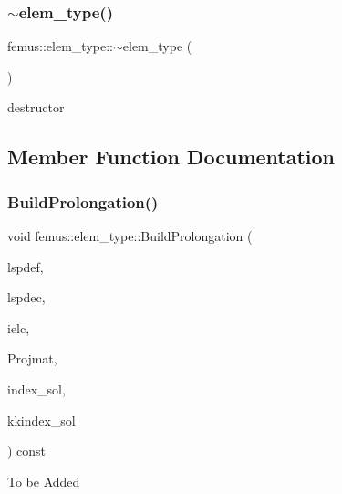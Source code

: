 \subsubsection{\texorpdfstring{$\sim$elem\+\_\+type()}{~elem\_type()}}
{\footnotesize\ttfamily femus\+::elem\+\_\+type\+::$\sim$elem\+\_\+type (\begin{DoxyParamCaption}{ }\end{DoxyParamCaption})\hspace{0.3cm}{\ttfamily [virtual]}}

destructor 

\subsection{Member Function Documentation}
\mbox{\label{classfemus_1_1elem__type_aaa5317cf0e1944adeaca3b5f1d0c3610}} 
\subsubsection{\texorpdfstring{Build\+Prolongation()}{BuildProlongation()}\hspace{0.1cm}{\footnotesize\ttfamily [1/3]}}
{\footnotesize\ttfamily void femus\+::elem\+\_\+type\+::\+Build\+Prolongation (\begin{DoxyParamCaption}\item[{const \mbox{\hyperlink{classfemus_1_1_linear_equation}{Linear\+Equation}} \&}]{lspdef,  }\item[{const \mbox{\hyperlink{classfemus_1_1_linear_equation}{Linear\+Equation}} \&}]{lspdec,  }\item[{const int \&}]{ielc,  }\item[{\mbox{\hyperlink{classfemus_1_1_sparse_matrix}{Sparse\+Matrix}} $\ast$}]{Projmat,  }\item[{const unsigned \&}]{index\+\_\+sol,  }\item[{const unsigned \&}]{kkindex\+\_\+sol }\end{DoxyParamCaption}) const}

To be Added \mbox{\label{classfemus_1_1elem__type_ab877a3438c82ef2b4f096f38c3811b7f}} 

